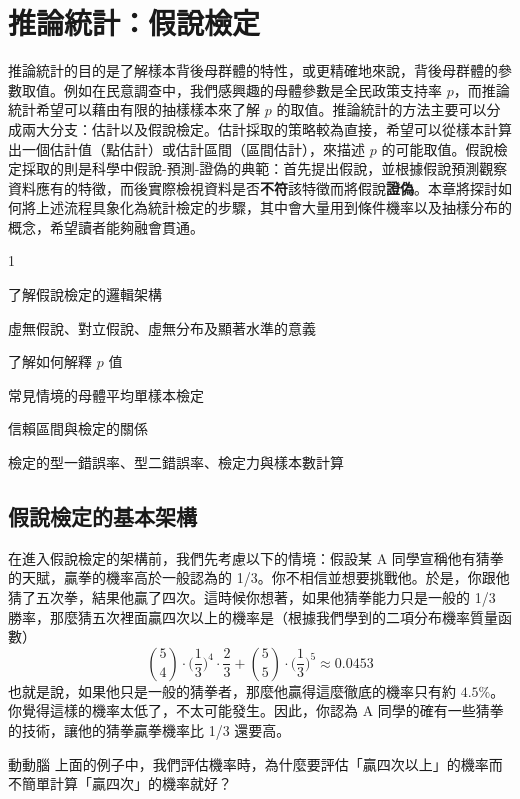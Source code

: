 \chapter{推論統計：假說檢定}

    推論統計的目的是了解樣本背後母群體的特性，或更精確地來說，背後母群體的參數取值。例如在民意調查中，我們感興趣的母體參數是全民政策支持率 $p$，而推論統計希望可以藉由有限的抽樣樣本來了解 $p$ 的取值。推論統計的方法主要可以分成兩大分支：估計以及假說檢定。估計採取的策略較為直接，希望可以從樣本計算出一個估計值（點估計）或估計區間（區間估計），來描述 $p$ 的可能取值。假說檢定採取的則是科學中假說-預測-證偽的典範：首先提出假說，並根據假說預測觀察資料應有的特徵，而後實際檢視資料是否\textbf{不符}該特徵而將假說\textbf{證偽}。本章將探討如何將上述流程具象化為統計檢定的步驟，其中會大量用到條件機率以及抽樣分布的概念，希望讀者能夠融會貫通。
    
    \begin{introduction}{1}
        \item 了解假說檢定的邏輯架構
        \item 虛無假說、對立假說、虛無分布及顯著水準的意義
        \item 了解如何解釋 $p$ 值
        \item 常見情境的母體平均單樣本檢定
        \item 信賴區間與檢定的關係
        \item 檢定的型一錯誤率、型二錯誤率、檢定力與樣本數計算
    \end{introduction}

\section{假說檢定的基本架構}

    在進入假說檢定的架構前，我們先考慮以下的情境：假設某 A 同學宣稱他有猜拳的天賦，贏拳的機率高於一般認為的 1/3。你不相信並想要挑戰他。於是，你跟他猜了五次拳，結果他贏了四次。這時候你想著，如果他猜拳能力只是一般的 1/3 勝率，那麼猜五次裡面贏四次以上的機率是（根據我們學到的二項分布機率質量函數）
    \smallskip
    \[\binom{5}{4} \cdot \Big(\frac{1}{3}\Big)^4 \cdot \frac{2}{3} + \binom{5}{5} \cdot \Big(\frac{1}{3}\Big)^5 \approx 0.0453\]
    \smallskip
    也就是說，如果他只是一般的猜拳者，那麼他贏得這麼徹底的機率只有約 $4.5 \%$。你覺得這樣的機率太低了，不太可能發生。因此，你認為 A 同學的確有一些猜拳的技術，讓他的猜拳贏拳機率比 1/3 還要高。

    \medskip

    \begin{custom}{動動腦}
        上面的例子中，我們評估機率時，為什麼要評估「贏四次以上」的機率而不簡單計算「贏四次」的機率就好？
    \end{custom}

